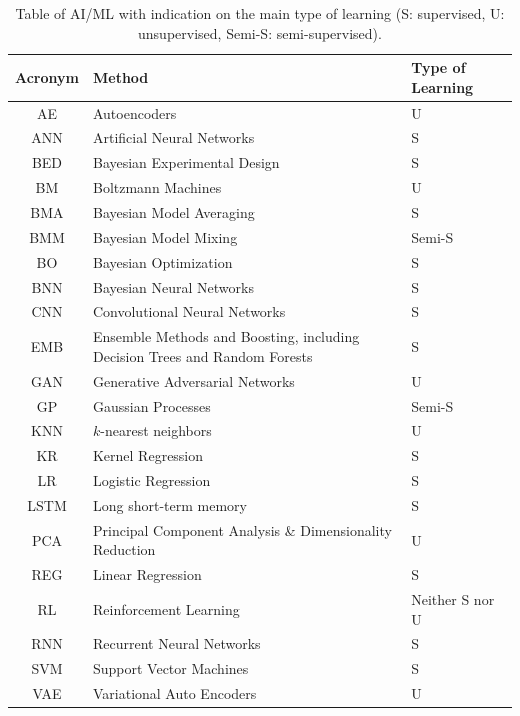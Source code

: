 \documentclass[aps,rmp,reprint,amsmath,amssymb,graphicx,longbibliography]{revtex4-2}
\begin{document}
\begin{table}[!htb]
 \caption{Table of AI/ML with indication on the main type of learning (S: supervised,  U: unsupervised,  Semi-S: semi-supervised).
 }
    \label{tab:acronyms}
\begin{ruledtabular}
    \begin{tabular}{cll} 
    Acronym & Method & Type of Learning \\ \hline 
    AE & Autoencoders & U \\
    ANN     & Artificial Neural Networks & S  \\ 
  BED & Bayesian Experimental Design   & S \\
        BM & Boltzmann Machines & U \\
    BMA & Bayesian Model Averaging & S \\
    BMM & Bayesian Model Mixing & Semi-S \\
    BO & Bayesian Optimization & S \\
    BNN & Bayesian Neural Networks & S \\
    CNN & Convolutional Neural Networks & S \\
     EMB  & Ensemble Methods  and Boosting, including Decision Trees and Random Forests & S \\
    GAN & Generative Adversarial Networks  & U \\
    GP & Gaussian Processes  & Semi-S \\
    KNN & $k$-nearest neighbors & U \\
    KR & Kernel Regression & S \\
    LR & Logistic Regression & S\\ 
    LSTM & Long short-term memory & S\\
    PCA & Principal Component Analysis \& Dimensionality Reduction & U \\
    REG    & Linear Regression  & S \\
    RL & Reinforcement Learning & Neither S nor U \\
    RNN & Recurrent Neural Networks & S \\
    SVM & Support Vector Machines & S \\
    VAE & Variational Auto Encoders & U 
     \end{tabular}
 \end{ruledtabular}  
\end{table}
\end{document}
